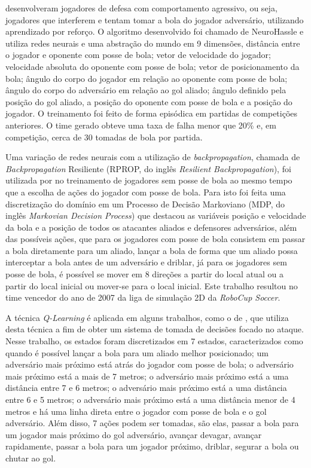  desenvolveram jogadores de defesa com comportamento agressivo, ou seja,
jogadores que interferem e tentam tomar a bola do jogador adversário, utilizando aprendizado por
reforço. O algoritmo desenvolvido foi chamado de NeuroHassle e utiliza redes neurais e uma abstração
do mundo em 9 dimensões, distância entre o jogador e oponente com posse de bola; vetor de velocidade
do jogador; velocidade absoluta do oponente com posse de bola; vetor de posicionamento da bola;
ângulo do corpo do jogador em relação ao oponente com posse de bola; ângulo do corpo do adversário
em relação ao gol aliado; ângulo definido pela posição do gol aliado, a posição do oponente com
posse de bola e a posição do jogador. O treinamento foi feito de forma episódica em partidas de
competições anteriores. O time gerado obteve uma taxa de falha menor que 20\% e, em competição,
cerca de 30 tomadas de bola por partida.

Uma variação de redes neurais com a utilização de \textit{backpropagation}, chamada de
\textit{Backpropagation} Resiliente (RPROP, do inglês \textit{Resilient Backpropagation}), foi
utilizada por  no treinamento de jogadores sem posse de
bola ao mesmo tempo que a escolha de ações do jogador com posse de bola. Para isto foi feita uma
discretização do domínio em um Processo de Decisão Markoviano (MDP, do inglês \textit{Markovian
Decision Process}) que destacou as variáveis posição e velocidade da bola e a posição de todos os
atacantes aliados e defensores adversários, além das possíveis ações, que para os jogadores com
posse de bola consistem em passar a bola diretamente para um aliado, lançar a bola de forma que um
aliado possa interceptar a bola antes de um adversário e driblar, já para os jogadores sem posse de
bola, é possível se mover em 8 direções a partir do local atual ou a partir do local inicial ou
mover-se para o local inicial. Este trabalho resultou no time vencedor do ano de 2007 da liga de
simulação 2D da \textit{RoboCup Soccer}.

A técnica \textit{Q-Learning} é aplicada em alguns trabalhos, como o de
, que utiliza desta técnica a fim de obter um sistema de tomada de
decisões focado no ataque. Nesse trabalho, os estados foram discretizados em 7 estados,
caracterizados como quando é possível lançar a bola para um aliado melhor posicionado; um adversário
mais próximo está atrás do jogador com posse de bola; o adversário mais próximo está a mais de 7
metros; o adversário mais próximo está a uma distância entre 7 e 6 metros; o adversário mais próximo
está a uma distância entre 6 e 5 metros; o adversário mais próximo está a uma distância menor de 4
metros e há uma linha direta entre o jogador com posse de bola e o gol adversário. Além disso, 7
ações podem ser tomadas, são elas, passar a bola para um jogador mais próximo do gol adversário,
avançar devagar, avançar rapidamente, passar a bola para um jogador próximo, driblar, segurar a bola
ou chutar ao gol.


